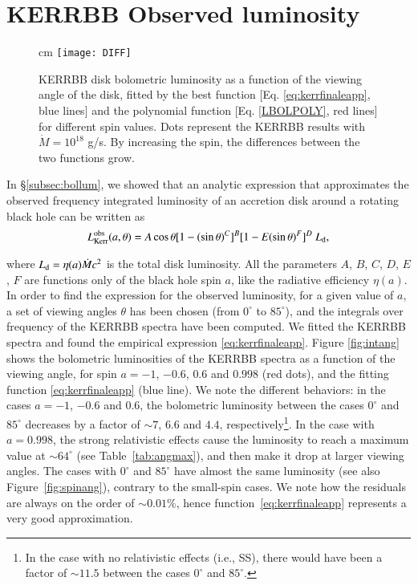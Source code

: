\documentclass{aa}
\begin{document}


\section{KERRBB Observed luminosity}

\begin{figure}
\centering
{} cm
\texttt{[image: DIFF]}
\caption{KERRBB disk bolometric luminosity as a function of the viewing angle of the disk, fitted by the best function [Eq. \eqref{eq:kerrfinaleapp}, blue lines] and the polynomial function [Eq. \eqref{LBOLPOLY}, red lines] for different spin values. Dots represent the KERRBB results with $\dot{M} = 10^{18}$ g/s. By increasing the spin, the differences between the two functions grow.}
\label{fig:dif}
\end{figure}

In \S \ref{subsec:bollum}, we showed that an analytic expression that approximates the observed frequency integrated luminosity of an accretion disk around a rotating black hole can be written as
	\begin{equation} \label{eq:kerrfinaleapp}
		L^{\rm obs}_{\rm Kerr} (a, \theta) = A \cos \theta [1 - (\sin \theta)^C]^B [1 - E (\sin \theta)^F]^D \ L_{\rm d},
	\end{equation}

\noindent where $L_{\rm d} = \eta(a) \dot{M} c^2$ is the total disk luminosity. All the parameters $A$, $B$, $C$, $D$, $E$, $F$ are functions only of the black hole spin $a$, like the radiative efficiency $\eta(a)$. In order to find the expression for the observed luminosity, for a given value of $a$, a set of viewing angles $\theta$ has been chosen (from $0^{\circ}$ to $85^{\circ}$), and the integrals over frequency of the KERRBB spectra have been computed. We fitted the KERRBB spectra and found the empirical expression \eqref{eq:kerrfinaleapp}. Figure \ref{fig:intang} shows the bolometric luminosities of the KERRBB spectra as a function of the viewing angle, for spin $a = -1$, $-0.6$, $0.6$ and $0.998$ (red dots), and the fitting function \eqref{eq:kerrfinaleapp} (blue line). We note the different behaviors: in the cases $a = -1$, $-0.6$ and $0.6$, the bolometric luminosity between the cases $0^{\circ}$ and $85^{\circ}$ decreases by a factor of $\sim 7$, $6.6$ and $4.4$, respectively\footnote{In the case with no relativistic effects (i.e., SS), there would have been a factor of $\sim 11.5$ between the cases $0^{\circ}$ and $85^{\circ}$.}. In the case with $a = 0.998$, the strong relativistic effects cause the luminosity to reach a maximum value at $\sim 64^{\circ}$ (see Table~\ref{tab:angmax}), and then make it drop at larger viewing angles. The cases with $0^{\circ}$ and $85^{\circ}$ have almost the same luminosity (see also Figure~\ref{fig:spinang}), contrary to the small-spin cases. We note how the residuals are always on the order of $\sim 0.01 \%$, hence function~\eqref{eq:kerrfinaleapp} represents a very good approximation.
\end{document}
